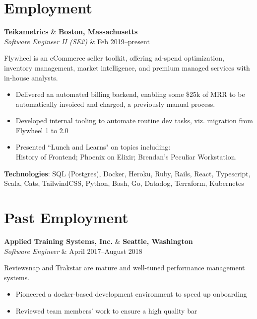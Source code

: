 \documentclass[line,margin]{res}
\newcommand{\role}[4]{
  \begin{tabularx}
    \textbf{#1}   & \hfill \textbf{#2} \\
    \textit{#3}   & \hfill #4          \\
  \end{tabularx}
}
\newcommand{\employerSummary}[1]{
  \begin{small} 
    #1 
  \end{small}
}
\newcommand{\impact}[1]{
    \begin{itemize}
        #1
    \end{itemize}
}
\newcommand{\technologies}[1]{
    \textbf{Technologies}: #1
}
\begin{document}
\begin{resume}
\section{\sc \footnotesize Employment}
  \role
    {Teikametrics}
    {Boston, Massachusetts}
    {Software Engineer II (SE2)}
    {Feb 2019--present}
  \employerSummary
    {Flywheel is an eCommerce seller toolkit, offering ad-spend optimization, inventory management,
     market intelligence, and premium managed services with in-house analysts.}
  \impact{
    \item Delivered an automated billing backend, enabling some \$25k of MRR to be automatically invoiced and charged, a previously manual process.
    \item Developed internal tooling to automate routine dev tasks, viz. migration from Flywheel 1 to 2.0
    \item Presented ``Lunch and Learns" on topics including: \\ History of Frontend; Phoenix on Elixir; Brendan's Peculiar Workstation.
  }
  \technologies{
    SQL (Postgres), Docker, Heroku, Ruby, Rails, React, Typescript, Scala, Cats,
    TailwindCSS, Python, Bash, Go, Datadog, Terraform, Kubernetes
  }

\newpage

\section{\sc \footnotesize Past Employment}


    \role
      {Applied Training Systems, Inc.}
      {Seattle, Washington}
      {Software Engineer}
      {April 2017--August 2018}
    \employerSummary
      {Reviewsnap and Trakstar are mature and well-tuned performance management systems.}
    \impact{
        \item Pioneered a docker-based development environment to speed up onboarding
        \item Reviewed team members' work to ensure a high quality bar
    }


\end{resume}
\end{document}
